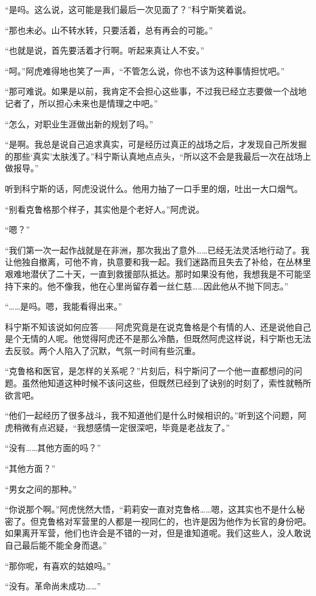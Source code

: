 “是吗。这么说，这可能是我们最后一次见面了？”科宁斯笑着说。

“那也未必。山不转水转，只要活着，总有再会的可能。”

“也就是说，首先要活着才行啊。听起来真让人不安。”

“呵。”阿虎难得地也笑了一声，“不管怎么说，你也不该为这种事情担忧吧。”

“那可难说。如果是以前，我肯定不会担心这些事，不过我已经立志要做一个战地记者了，所以担心未来也是情理之中吧。”

“怎么，对职业生涯做出新的规划了吗。”

“是啊。我总是说自己追求真实，可是经历过真正的战场之后，才发现自己所发掘的那些‘真实’太肤浅了。”科宁斯认真地点点头，“所以这不会是我最后一次在战场上做报导。”

听到科宁斯的话，阿虎没说什么。他用力抽了一口手里的烟，吐出一大口烟气。

“别看克鲁格那个样子，其实他是个老好人。”阿虎说。

“嗯？”

“我们第一次一起作战就是在非洲，那次我出了意外……已经无法灵活地行动了。我让他独自撤离，可他不肯，执意要和我一起。我们迷路而且失去了补给，在丛林里艰难地潜伏了二十天，一直到救援部队抵达。那时如果没有他，我想我是不可能坚持下来的。他不像我，他在心里尚留存着一丝仁慈……因此他从不抛下同志。”

“……是吗。嗯，我能看得出来。”

科宁斯不知该说如何应答——阿虎究竟是在说克鲁格是个有情的人、还是说他自己是个无情的人呢。他觉得阿虎还不是那么冷酷，但既然阿虎这样说，科宁斯也无法去反驳。两个人陷入了沉默，气氛一时间有些沉重。

“克鲁格和医官，是怎样的关系呢？”片刻后，科宁斯问了一个他一直都想问的问题。虽然他知道这种时候不该问这些，但既然已经到了诀别的时刻了，索性就畅所欲言吧。

“他们一起经历了很多战斗，我不知道他们是什么时候相识的。”听到这个问题，阿虎稍微有点迟疑，“我想感情一定很深吧，毕竟是老战友了。”

“没有……其他方面的吗？”

“其他方面？”

“男女之间的那种。”

“你说那个啊。”阿虎恍然大悟，“莉莉安一直对克鲁格……嗯，这其实也不是什么秘密了。但克鲁格对军营里的人都是一视同仁的，也许是因为他作为长官的身份吧。如果离开军营，他们也许会是不错的一对，但是谁知道呢。我们这些人，没人敢说自己最后能不能全身而退。”

“那你呢，有喜欢的姑娘吗。”

“没有。革命尚未成功……”


